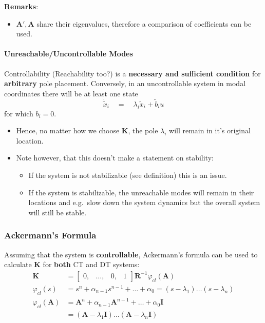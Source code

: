 \textbf{Remarks}:
\begin{itemize}
    \item $\mathbf{A'},\mathbf{A}$ share their eigenvalues, therefore a comparison of coefficients can be used.
\end{itemize}

\paragraph{Unreachable/Uncontrollable Modes}
Controllability (Reachability too?) is a \textbf{necessary and sufficient condition} for \textbf{arbitrary} pole placement.
Conversely, in an uncontrollable system in modal coordinates there will be at least one state
\begin{equation*}
    \dot{\tilde{x}}_i\quad=\quad\lambda_i\tilde{x}_i+\tilde{b}_i u
\end{equation*}
for which $b_i=0$.
\begin{itemize}
    \item Hence, no matter how we choose $\mathbf{K}$, the pole $\lambda_i$ will remain in it's original location.
    \item Note however, that this doesn't make a statement on stability:
          \begin{itemize}
              \item If the system is not stabilizable (see definition) this is an issue.
              \item If the system is stabilizable, the unreachable modes will remain in their locations and e.g.\ slow down the system dynamics but the overall system will still be stable.
          \end{itemize}
\end{itemize}

\subsubsection{Ackermann's Formula}
Assuming that the system is \textbf{controllable}, Ackermann's formula can be used to calculate $\mathbf{K}$ for \textbf{both} CT and DT systems:
\noindent\begin{align*}
    \mathbf{K}               & =\begin{bmatrix}
                                    0, & \ldots, & 0, & 1
                                \end{bmatrix}
    \mathbf{R}^{-1}\varphi_{cl}(\mathbf{A})                                                               \\
    \varphi_{cl}(s)          & =s^n+\alpha_{n-1}s^{n-1}+\ldots+\alpha_0=(s-\lambda_1)\ldots(s-\lambda_n)  \\
    \varphi_{cl}(\mathbf{A}) & =\mathbf{A}^n+\alpha_{n-1}\mathbf{A}^{n-1}+\ldots+\alpha_0 \mathbf{I}      \\
                             & = (\mathbf{A}-\lambda_1 \mathbf{I})\ldots(\mathbf{A}-\lambda_n \mathbf{I})
\end{align*}

